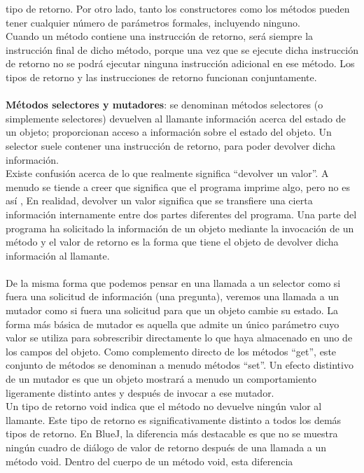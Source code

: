 \documentclass[11pt,a4paper]{article}
\begin{document}
	tipo de retorno. Por otro lado, tanto los constructores como los métodos pueden tener cualquier
	número de parámetros formales, incluyendo ninguno.\\
	Cuando un método contiene una instrucción de retorno, será siempre la instrucción final de dicho
	método, porque una vez que se ejecute dicha instrucción de retorno no se podrá ejecutar ninguna
	instrucción adicional en ese método.
	Los tipos de retorno y las instrucciones de retorno funcionan conjuntamente.\\
	\\
	\textbf{Métodos selectores y mutadores}:  se denominan métodos selectores (o simplemente selectores) devuelven al llamante información acerca del estado de un objeto; proporcionan acceso a información
	sobre el estado del objeto. Un selector suele contener una instrucción de retorno, para poder
	devolver dicha información.\\
	Existe confusión acerca de lo que realmente significa “devolver un valor”. A menudo se tiende
	a creer que significa que el programa imprime algo, pero no es así , En realidad, devolver
	un valor significa que se transfiere una cierta información internamente entre dos partes diferentes
	del programa. Una parte del programa ha solicitado la información de un objeto mediante la invocación de un método y el valor de retorno es la forma que tiene el objeto de devolver dicha
	información al llamante.\\
	\\
	De la misma forma que podemos pensar en una llamada a un selector como si fuera una solicitud de
	información (una pregunta), veremos una llamada a un mutador como si fuera una solicitud para
	que un objeto cambie su estado. La forma más básica de mutador es aquella que admite un único
	parámetro cuyo valor se utiliza para sobrescribir directamente lo que haya almacenado en uno de
	los campos del objeto. Como complemento directo de los métodos “get”, este conjunto de métodos
	se denominan a menudo métodos “set”. Un efecto distintivo de un mutador es que un objeto mostrará a menudo un comportamiento ligeramente
	distinto antes y después de invocar a ese mutador.\\
	Un tipo de retorno void indica que el método no devuelve ningún valor al llamante.
	Este tipo de retorno es significativamente distinto a todos los demás tipos de retorno. En BlueJ,
	la diferencia más destacable es que no se muestra ningún cuadro de diálogo de valor de retorno
	después de una llamada a un método void. Dentro del cuerpo de un método void, esta diferencia
\end{document}
